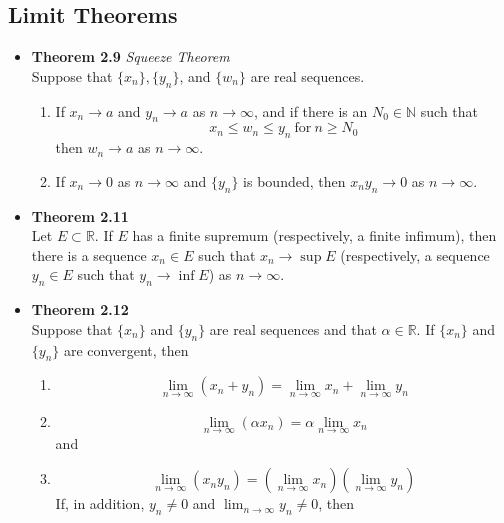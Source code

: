 \documentclass[11pt,a4paper]{article}
\begin{document}
\subsection{Limit Theorems}

\begin{itemize}
    \item \textbf{Theorem 2.9} \emph{Squeeze Theorem} \\
        Suppose that $\{x_n\}, \{y_n\}$, and $\{w_n\}$ are real sequences.
        \begin{enumerate}
            \item If $x_n \to a$ and $y_n \to a$ as $n \to \infty$,
                and if there is an $N_0 \in \mathbb{N}$ such that
                \[
                    x_n \leq w_n \leq y_n \ \text{for} \ n \geq N_0
                \]
                then $w_n \to a$ as $n \to \infty$.
            \item If $x_n \to 0$ as $n \to \infty$ and $\{y_n\}$ is bounded,
                then $x_n y_n \to 0$ as $n \to \infty$.
        \end{enumerate}
    \item \textbf{Theorem 2.11} \\
        Let $E \subset \mathbb{R}$.
        If $E$ has a finite supremum (respectively, a finite infimum),
        then there is a sequence $x_n \in E$ such that $x_n \to \sup E$
        (respectively, a sequence $y_n \in E$ such that $y_n \to \inf E$)
        as $n \to \infty$.
    \item \textbf{Theorem 2.12} \\
        Suppose that $\{x_n\}$ and $\{y_n\}$ are real sequences and that
        $\alpha \in \mathbb{R}$.
        If $\{x_n\}$ and $\{y_n\}$ are convergent, then
        \begin{enumerate}
            \item
                \[
                    \lim_{n \to \infty} (x_n + y_n) =
                    \lim_{n \to \infty} x_n + \lim_{n \to \infty} y_n
                \]
            \item
                \[
                    \lim_{n \to \infty} (\alpha x_n) = \alpha \lim_{n \to \infty} x_n
                \]
                and
            \item
                \[
                    \lim_{n \to \infty} (x_n y_n) =
                    ( \lim_{n \to \infty} x_n ) (\lim_{n \to \infty} y_n)
                \]
                If, in addition, $y_n \neq 0$ and $\lim_{n \to \infty} y_n \neq 0$, then

\end{enumerate}
\end{itemize}
\end{document}
